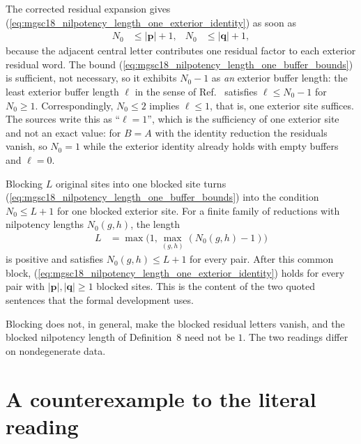 \documentclass{article}
\begin{document}
The corrected residual expansion
\cite{gap:mgsc18_residual_expansion_empty_word_error} gives
(\ref{eq:mgsc18_nilpotency_length_one_exterior_identity}) as soon as
\begin{align}
    N_0
        &\leq|\mathbf p|+1,
    &N_0
        &\leq|\mathbf q|+1,
    \label{eq:mgsc18_nilpotency_length_one_buffer_bounds}
\end{align}
because the adjacent central letter contributes one residual factor to
each exterior residual word.  The bound
(\ref{eq:mgsc18_nilpotency_length_one_buffer_bounds}) is sufficient, not
necessary, so it exhibits $N_0-1$ as \emph{an} exterior buffer length: the
least exterior buffer length $\ell$ in the sense of
Ref.~\cite{FrancoRubio2025MPUGauging} satisfies $\ell\leq N_0-1$ for
$N_0\geq1$.  Correspondingly, $N_0\leq2$ implies $\ell\leq1$, that is, one
exterior site suffices.  The sources write this as ``$\ell=1$'', which is
the sufficiency of one exterior site and not an exact value: for $B=A$ with
the identity reduction the residuals vanish, so $N_0=1$ while the exterior
identity already holds with empty buffers and $\ell=0$.

Blocking $L$ original sites into one blocked site turns
(\ref{eq:mgsc18_nilpotency_length_one_buffer_bounds}) into the condition
$N_0\leq L+1$ for one blocked exterior site.  For a finite family of
reductions with nilpotency lengths $N_0(g,h)$, the length
\begin{align}
    L
        &=\max\bigl(1,\max_{(g,h)}(N_0(g,h)-1)\bigr)
    \label{eq:mgsc18_nilpotency_length_one_common_length}
\end{align}
is positive and satisfies $N_0(g,h)\leq L+1$ for every pair.  After this
common block, (\ref{eq:mgsc18_nilpotency_length_one_exterior_identity})
holds for every pair with $|\mathbf p|,|\mathbf q|\geq1$ blocked sites.
This is the content of the two quoted sentences that the formal
development uses.

Blocking does not, in general, make the blocked residual letters vanish,
and the blocked nilpotency length of
Definition~8 need not be $1$.  The two readings differ on nondegenerate
data.

\section{A counterexample to the literal reading}
\end{document}

